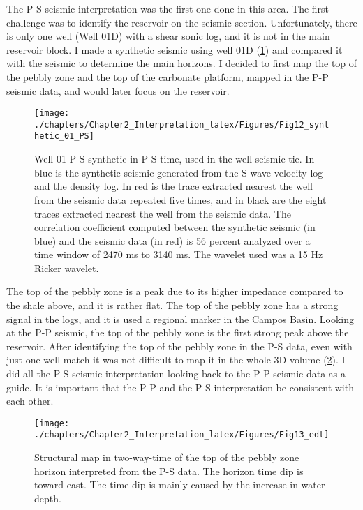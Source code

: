The P-S seismic interpretation was the first one done in this area. The first challenge was to identify the reservoir on the seismic section. Unfortunately, there is only one well (Well 01D) with a shear sonic log, and it is not in the main reservoir block. I made a synthetic seismic using well 01D (\ref{fig:synt_01_P-S})  and compared it with the seismic to determine the main horizons. I decided to first map the top of the pebbly zone and the top of the carbonate platform, mapped in the P-P seismic data, and would later focus on the reservoir.

\begin{figure}[hbtp]
	\begin{center}
	\texttt{[image: ./chapters/Chapter2\_Interpretation\_latex/Figures/Fig12\_synthetic\_01\_PS]}
			\caption[Well 01 P-S synthetic in P-S time.]{Well 01 P-S synthetic in P-S time, used in the well seismic tie. In blue is the synthetic seismic generated from the S-wave velocity log and the density log. In red is the trace extracted nearest the well from the seismic data repeated five times, and in black are the eight traces extracted nearest the well from the seismic data. The correlation coefficient computed between the synthetic seismic (in blue) and the seismic data (in red) is 56 percent analyzed over a time window of 2470 ms to 3140 ms. The wavelet used was a 15 Hz Ricker wavelet.}
			\label{fig:synt_01_P-S}
		\end{center}
	\end{figure}


The top of the pebbly zone is a peak due to its higher impedance compared to the shale above, and it is rather flat. The top of the pebbly zone has a strong signal in the logs, and it is used a regional marker in the Campos Basin.  Looking at the P-P seismic, the top of the pebbly zone is the first strong peak above the reservoir. After identifying the top of the pebbly zone in the P-S data, even with just one well match it was not difficult to map it in the whole 3D volume (\ref{fig:map_PB_time_PS}). I did all the P-S seismic interpretation looking back to the P-P seismic data as a guide. It is important that the P-P and the P-S interpretation be consistent with each other.

\begin{figure}[hbtp]
	\begin{center}
	\texttt{[image: ./chapters/Chapter2\_Interpretation\_latex/Figures/Fig13\_edt]}
			\caption[ Structural map in two-way-time of the top of the pebbly zone horizon interpreted from the P-S data. ]{Structural map in two-way-time of the top of the pebbly zone horizon interpreted from the P-S data. The horizon time dip is toward east. The time dip is mainly caused by the increase in water depth.}
			\label{fig:map_PB_time_PS}
		\end{center}
	\end{figure}


